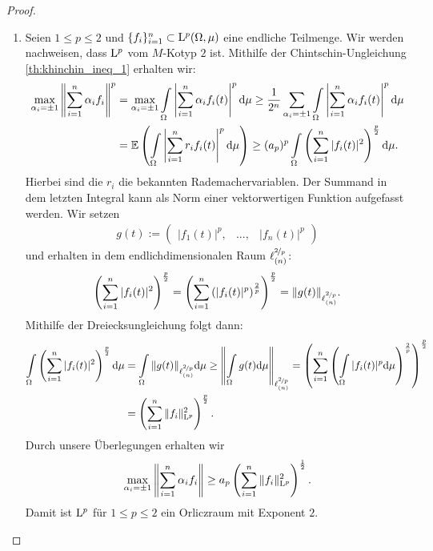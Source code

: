 \begin{proof}

	\begin{enumerate}
		\item Seien $ 1 \leq p \leq 2 $ und  $ \{f_i\}_{i = 1}^n \subset \mathrm{L}^p(\Omega,\mu)$ eine endliche Teilmenge.
		Wir werden nachweisen, dass $ \mathrm{L}^p $ vom $ M $-Kotyp $ 2 $ ist.
		Mithilfe der Chintschin-Ungleichung \ref{th:khinchin_ineq_1} erhalten wir:
		\begin{align*}
			\max \limits_{\alpha_i = \pm 1}
			\left\|
			\sum 
			\limits_{i = 1}^n \alpha_i f_i
			\right\|^p
			&=
			\max \limits_{\alpha_i = \pm 1}
			\int \limits_\Omega
			\left|
			\sum 
			\limits_{i = 1}^n \alpha_i f_i(t)
			\right|^p
			\mathrm{d}\mu
			\geq 
			\frac{1}{2^n}
			\sum \limits_{\alpha_i = \pm 1 }
			\int \limits_\Omega
			\left|
			\sum 
			\limits_{i = 1}^n \alpha_i f_i(t)
			\right|^p
			\mathrm{d}\mu\\
			&=
			\mathbb{E}
			\left(
			\int \limits_\Omega
			\left|
			\sum 
			\limits_{i = 1}^n r_i f_i(t)
			\right|^p
			\mathrm{d}\mu
			\right)
			\geq 
			(a_p)^p
			\int \limits_\Omega
			\left(
			\sum 
			\limits_{i = 1}^n |f_i(t)|^2
			\right)^\frac{p}{2}
			\mathrm{d}\mu.
		\end{align*}
		Hierbei sind die $ r_i $ die bekannten Rademachervariablen.
		Der Summand in dem letzten Integral kann als Norm einer vektorwertigen Funktion aufgefasst werden. Wir setzen
		\begin{align*}
			g(t) := \begin{pmatrix}
				|f_1(t)|^p ,& ...,& |f_n(t)|^p
			\end{pmatrix}
		\end{align*}
		und erhalten in dem endlichdimensionalen Raum $ \ell^{\nicefrac{2}{p}}_{(n)} $:
		\begin{align*}
			\left(
			\sum 
			\limits_{i = 1}^n |f_i(t)|^2
			\right)^\frac{p}{2}
			=
			\left(
			\sum 
			\limits_{i = 1}^n \left(|f_i(t)|^p\right)^\frac{2}{p}
			\right)^\frac{p}{2}
			=
			\| g(t) \|_{\ell^{\nicefrac{2}{p}}_{(n)}}.
		\end{align*}
		 Mithilfe der Dreiecksungleichung folgt dann:
		\begin{align*}
			\int \limits_\Omega
			\left(
			\sum 
			\limits_{i = 1}^n |f_i(t)|^2
			\right)^\frac{p}{2}
			\mathrm{d}\mu
			&=
			\int \limits_\Omega
			\| g(t) \|_{\ell^{\nicefrac{2}{p}}_{(n)}}
			\mathrm{d}\mu
			\geq 
			\left\|
			\int \limits_\Omega
			g(t) 
			\mathrm{d}\mu
			\right\|_{\ell^{\nicefrac{2}{p}}_{(n)}}
			=
			\left(
			\sum \limits_{i = 1}^n
			\left(
			\int \limits_\Omega
			|f_i(t)|^p 
			\mathrm{d}\mu
			\right)^\frac{2}{p}
			\right)^\frac{p}{2}\\
			&=
			\left(
			\sum_{i  = 1 }^n
			\| f_i \|_{\mathrm{L}^p}^2
			\right)^\frac{p}{2}.
		\end{align*}
		Durch unsere Überlegungen erhalten wir
		\begin{align*}
			\max \limits_{\alpha_i = \pm 1}
			\left\|
			\sum 
			\limits_{i = 1}^n \alpha_i f_i
			\right\|
			\geq 
			a_p 
			\left(
			\sum_{i  = 1 }^n
			\| f_i \|_{\mathrm{L}^p}^2
			\right)^\frac{1}{2}.
		\end{align*}
		Damit ist $ \mathrm{L}^p $ für $ 1 \leq p \leq 2 $ ein Orliczraum mit Exponent $ 2 $.
		

\end{enumerate}
\end{proof}
